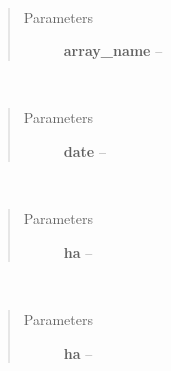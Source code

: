 \documentclass[a4paper,10pt,english]{sphinxmanual}
\begin{document}
\begin{fulllineitems}
\begin{fulllineitems}
\end{fulllineitems}


\begin{fulllineitems}
\label{wtoapi:wtoAlgorithm.WtoAlgorithm.set_bl_prop}~\begin{quote}\begin{description}
\item[{Parameters}] \leavevmode
\textbf{array\_name} -- 

\end{description}\end{quote}

\end{fulllineitems}


\begin{fulllineitems}
\label{wtoapi:wtoAlgorithm.WtoAlgorithm.set_date}~\begin{quote}\begin{description}
\item[{Parameters}] \leavevmode
\textbf{date} -- 

\end{description}\end{quote}

\end{fulllineitems}


\begin{fulllineitems}
\label{wtoapi:wtoAlgorithm.WtoAlgorithm.set_maxha}~\begin{quote}\begin{description}
\item[{Parameters}] \leavevmode
\textbf{ha} -- 

\end{description}\end{quote}

\end{fulllineitems}


\begin{fulllineitems}
\label{wtoapi:wtoAlgorithm.WtoAlgorithm.set_minha}~\begin{quote}\begin{description}
\item[{Parameters}] \leavevmode
\textbf{ha} -- 


\end{description}
\end{quote}
\end{fulllineitems}
\end{fulllineitems}
\end{document}
